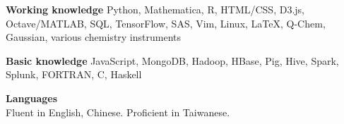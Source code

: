 \documentclass[12pt,letterpaper]{article}
\newcommand{\mhead}[1]{\leavevmode\marginpar{\sffamily\footnotesize #1}}
\begin{document}
\bigskip
\mhead{Skills}%
\textbf{Working knowledge}\newline%
Python, Mathematica, R, HTML/CSS, D3.js, Octave/MATLAB, SQL, TensorFlow, SAS, Vim, Linux, \LaTeX,
Q-Chem, Gaussian, various chemistry instruments

\smallskip
\textbf{Basic knowledge}\newline%
JavaScript, MongoDB,  Hadoop, HBase, Pig, Hive, Spark, Splunk, FORTRAN, C, Haskell

\smallskip
\textbf{Languages}\\
Fluent in English, Chinese. Proficient in Taiwanese.
\end{document}
